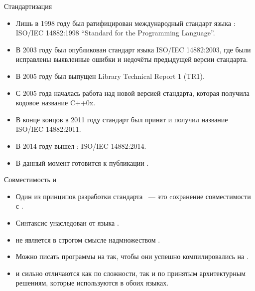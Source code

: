 \documentclass[aspectration=1610,t]{beamer}
\begin{document}
\begin{frame}{Стандартизация \langcpp}
    \begin{itemize}
        \item Лишь в 1998 году был ратифицирован международный стандарт языка 
            \langcpp: ISO/IEC 14882:1998 ``Standard for the \langcpp Programming
            Language''.
        
        \item В 2003 году был опубликован стандарт языка ISO/IEC 14882:2003, где были
            исправлены выявленные ошибки и недочёты предыдущей версии стандарта.

        \item В 2005 году был выпущен Library Technical Report 1 (TR1). 
            
        \item С 2005 года началась работа над новой версией стандарта, которая
            получила кодовое название C++0x. 
            
        \item В конце концов в 2011 году стандарт был принят и получил название
            \langcpp[11] ISO/IEC 14882:2011. 

        \item В 2014 году вышел \langcpp[14]: ISO/IEC 14882:2014. 
            
        \item В данный момент готовится к публикации \langcpp[17].
    \end{itemize}
\end{frame}

\begin{frame}{Совместимость \langc и \langcpp}

    \begin{itemize}
        \item Один из принципов разработки стандарта \langcpp~— это
            cохранение совместимости с \langc. 
            
        \item Синтаксис \langcpp унаследован от языка \langc. 
            
        \item \langcpp не является в строгом смысле надмножеством \langc.
            
        \item Можно писать программы на \langc так, чтобы они успешно
            компилировались на \langcpp.
            
        \item \langc и \langcpp сильно отличаются как по сложности, так и по принятым 
            архитектурным решениям, которые используются в обоих языках.
    \end{itemize}
\end{frame}
\end{document}
